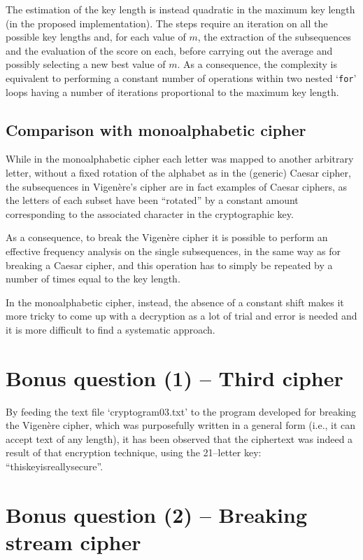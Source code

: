 \documentclass[12pt]{article}
\begin{document}
The estimation of the key length is instead quadratic in the maximum key length (in the proposed implementation).
The steps require an iteration on all the possible key lengths and, for each value of $m$, the extraction of the subsequences and the evaluation of the score on each, before carrying out the average and possibly selecting a new best value of $m$.
As a consequence, the complexity is equivalent to performing a constant number of operations within two nested `\verb|for|' loops having a number of iterations proportional to the maximum key length.

\subsection{Comparison with monoalphabetic cipher}

While in the monoalphabetic cipher each letter was mapped to another arbitrary letter, without a fixed rotation of the alphabet as in the (generic) Caesar cipher, the subsequences in Vigenère's cipher are in fact examples of Caesar ciphers, as the letters of each subset have been ``rotated'' by a constant amount corresponding to the associated character in the cryptographic key.

As a consequence, to break the Vigenère cipher it is possible to perform an effective frequency analysis on the single subsequences, in the same way as for breaking a Caesar cipher, and this operation has to simply be repeated by a number of times equal to the key length.

In the monoalphabetic cipher, instead, the absence of a constant shift makes it more tricky to come up with a decryption as a lot of trial and error is needed and it is more difficult to find a systematic approach.

\section{Bonus question (1) – Third cipher}

By feeding the text file `cryptogram03.txt' to the program developed for breaking the Vigenère cipher, which was purposefully written in a general form (i.e., it can accept text of any length), it has been observed that the ciphertext was indeed a result of that encryption technique, using the 21–letter key: ``thiskeyisreallysecure''.

\section{Bonus question (2) – Breaking stream cipher}
\end{document}
